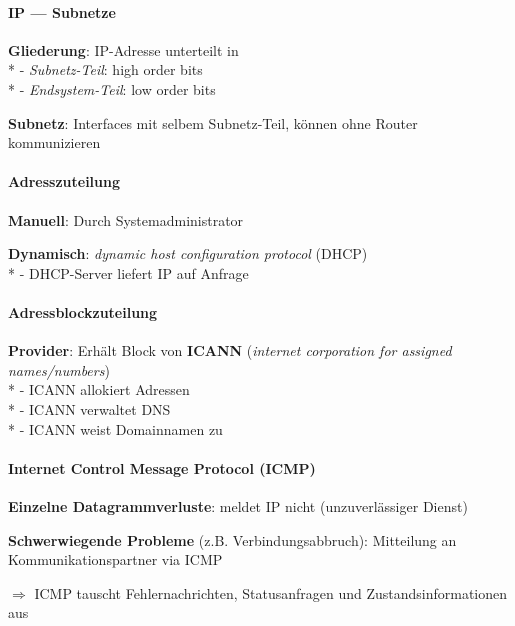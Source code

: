 \paragraph{IP --- Subnetze}
\begin{items}
  \item \textbf{Gliederung}: IP-Adresse unterteilt in \\*
    - \emph{Subnetz-Teil}: high order bits \\*
    - \emph{Endsystem-Teil}: low order bits
  \item \textbf{Subnetz}: Interfaces mit selbem Subnetz-Teil, können ohne Router kommunizieren
\end{items}

\paragraph{Adresszuteilung}
\begin{items}
  \item \textbf{Manuell}: Durch Systemadministrator
  \item \textbf{Dynamisch}: \emph{dynamic host configuration protocol} (DHCP) \\*
    - DHCP-Server liefert IP auf Anfrage
\end{items}

\paragraph{Adressblockzuteilung}
\begin{items}
  \item \textbf{Provider}: Erhält Block von \textbf{ICANN} (\emph{internet corporation for assigned names/numbers}) \\*
    - ICANN allokiert Adressen \\*
    - ICANN verwaltet DNS \\*
    - ICANN weist Domainnamen zu
\end{items}

\paragraph{Internet Control Message Protocol (ICMP)}
\begin{items}
  \item \textbf{Einzelne Datagrammverluste}: meldet IP nicht (unzuverlässiger Dienst)
  \item \textbf{Schwerwiegende Probleme} (z.B. Verbindungsabbruch): Mitteilung an Kommunikationspartner via ICMP
  \item \( \Rightarrow \) ICMP tauscht Fehlernachrichten, Statusanfragen und Zustandsinformationen aus
\end{items}

